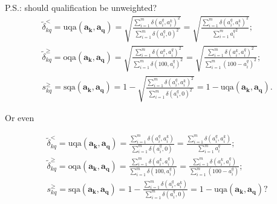 \documentclass{elsarticle} %
\begin{document}
P.S.: should qualification be unweighted?
\begin{gather}
    \tilde{\delta}_{kq}^{<} =
    \text{uqa}(\boldsymbol{a_k}, \boldsymbol{a_q}) =
    \sqrt{
    \frac{
    \sum_{i=1}^{m}{
    {\delta(a_{i}^{q}, a_{i}^{k})} ^ 2
    }
    }{
    \sum_{i=1}^{m}{
    {\delta(a_{i}^{q}, 0)} ^ 2
    }
    }
    } =
    \sqrt{
    \frac{
    \sum_{i=1}^{m}{
    {\delta(a_{i}^{q}, a_{i}^{k})} ^ 2
    }
    }{
    \sum_{i=1}^{m}{
    {a_{i}^{q}} ^ 2
    }
    }
    }
    ;\\
    \tilde{\delta}_{kq}^{\geq} =
    \text{oqa}(\boldsymbol{a_k}, \boldsymbol{a_q}) =
    \sqrt{
    \frac{
    \sum_{i=1}^{m}{
    {\delta(a_{i}^{k}, a_{i}^{q})} ^ 2
    }
    }{
    \sum_{i=1}^{m}{
    {\delta(100, a_{i}^{q})} ^ 2
    }
    }
    } =
    \sqrt{
    \frac{
    \sum_{i=1}^{m}{
    {\delta(a_{i}^{k}, a_{i}^{q})} ^ 2
    }
    }{
    \sum_{i=1}^{m}{
    {(100 - a_{i}^{q})} ^ 2
    }
    }
    }
    ;\\
    s_{kq}^{\geq} =
    \text{sqa}(\boldsymbol{a_k}, \boldsymbol{a_q}) =
    1 -
    \sqrt{
    \frac{
    \sum_{i=1}^{m}{
    {\delta(a_{i}^{q}, a_{i}^{k})} ^ 2
    }
    }{
    \sum_{i=1}^{m}{
    {\delta(a_{i}^{q}, 0)} ^ 2
    }
    }
    } =
    1 - \text{uqa}(\boldsymbol{a_k}, \boldsymbol{a_q})
    .
\end{gather}

Or even

\begin{gather}
    \tilde{\delta}_{kq}^{<} =
    \text{uqa}(\boldsymbol{a_k}, \boldsymbol{a_q}) =
    \frac{
    \sum_{i=1}^{m}{
    {\delta(a_{i}^{q}, a_{i}^{k})}
    }
    }{
    \sum_{i=1}^{m}{
    {\delta(a_{i}^{q}, 0)}
    }
    } =
    \frac{
    \sum_{i=1}^{m}{
    {\delta(a_{i}^{q}, a_{i}^{k})}
    }
    }{
    \sum_{i=1}^{m}{
    {a_{i}^{q}}
    }
    }
    ;\\
    \tilde{\delta}_{kq}^{\geq} =
    \text{oqa}(\boldsymbol{a_k}, \boldsymbol{a_q}) =
    \frac{
    \sum_{i=1}^{m}{
    {\delta(a_{i}^{k}, a_{i}^{q})}
    }
    }{
    \sum_{i=1}^{m}{
    {\delta(100, a_{i}^{q})}
    }
    } =
    \frac{
    \sum_{i=1}^{m}{
    {\delta(a_{i}^{k}, a_{i}^{q})}
    }
    }{
    \sum_{i=1}^{m}{
    {(100 - a_{i}^{q})}
    }
    }
    ;\\
    s_{kq}^{\geq} =
    \text{sqa}(\boldsymbol{a_k}, \boldsymbol{a_q}) =
    1 -
    \frac{
    \sum_{i=1}^{m}{
    {\delta(a_{i}^{q}, a_{i}^{k})}
    }
    }{
    \sum_{i=1}^{m}{
    {\delta(a_{i}^{q}, 0)}
    }
    } =
    1 - \text{uqa}(\boldsymbol{a_k}, \boldsymbol{a_q})
    ?
\end{gather}
\end{document}
